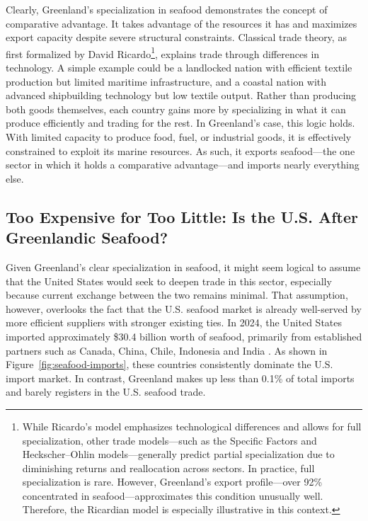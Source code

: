 \documentclass{adonis}
\begin{document}
    Clearly, Greenland’s specialization in seafood demonstrates the concept of comparative advantage. It takes advantage of the resources it has and maximizes export capacity despite severe structural constraints. Classical trade theory, as first formalized by David Ricardo\footnote{While Ricardo’s model emphasizes technological differences and allows for full specialization, other trade models—such as the Specific Factors and Heckscher–Ohlin models—generally predict partial specialization due to diminishing returns and reallocation across sectors. In practice, full specialization is rare. However, Greenland’s export profile—over 92\% concentrated in seafood—approximates this condition unusually well. Therefore, the Ricardian model is especially illustrative in this context.}, explains trade through differences in technology. A simple example could be a landlocked nation with efficient textile production but limited maritime infrastructure, and a coastal nation with advanced shipbuilding technology but low textile output. Rather than producing both goods themselves, each country gains more by specializing in what it can produce efficiently and trading for the rest. In Greenland’s case, this logic holds. With limited capacity to produce food, fuel, or industrial goods, it is effectively constrained to exploit its marine resources. As such, it exports seafood—the one sector in which it holds a comparative advantage—and imports nearly everything else.
    
    \subsection*{Too Expensive for Too Little: Is the U.S. After Greenlandic Seafood?}
    
    Given Greenland’s clear specialization in seafood, it might seem logical to assume that the United States would seek to deepen trade in this sector, especially because current exchange between the two remains minimal. That assumption, however, overlooks the fact that the U.S. seafood market is already well-served by more efficient suppliers with stronger existing ties. In 2024, the United States imported approximately \$30.4 billion worth of seafood, primarily from established partners such as Canada, China, Chile, Indonesia and India \citep{usda2025foodimports}. As shown in Figure~\ref{fig:seafood-imports}, these countries consistently dominate the U.S. import market. In contrast, Greenland makes up less than 0.1\% of total imports and barely registers in the U.S. seafood trade.
    
\end{document}
